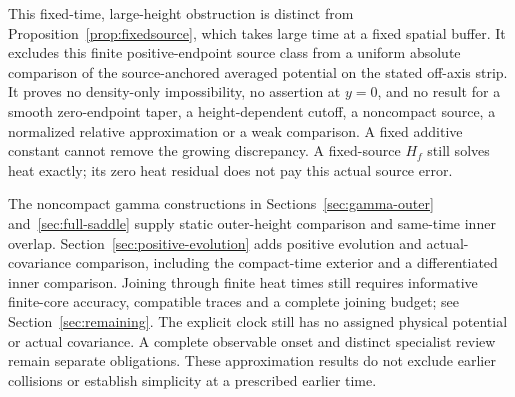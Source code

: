 This fixed-time, large-height obstruction \cite{n25} is distinct from
Proposition~\ref{prop:fixedsource}, which takes large time at a fixed
spatial buffer. It excludes this finite positive-endpoint source class
from a uniform absolute comparison of the source-anchored averaged
potential on the stated off-axis strip. It proves no density-only
impossibility, no assertion at $y=0$, and no result for a smooth
zero-endpoint taper, a height-dependent cutoff, a noncompact source,
a normalized relative approximation or a weak comparison. A fixed
additive constant cannot remove the growing discrepancy. A fixed-source
$H_f$ still solves heat exactly; its zero heat residual does not pay this
actual source error.

The noncompact gamma constructions in Sections~\ref{sec:gamma-outer}
and~\ref{sec:full-saddle} supply static outer-height comparison and
same-time inner overlap. Section~\ref{sec:positive-evolution} adds positive
evolution and actual-covariance comparison, including the compact-time
exterior and a differentiated inner comparison. Joining through finite
heat times still requires informative finite-core accuracy, compatible
traces and a complete joining budget; see Section~\ref{sec:remaining}.
The explicit clock still has no assigned physical potential or actual
covariance. A complete observable onset and distinct specialist review
remain separate obligations. These approximation results do not exclude
earlier collisions or establish simplicity at a prescribed earlier time.
